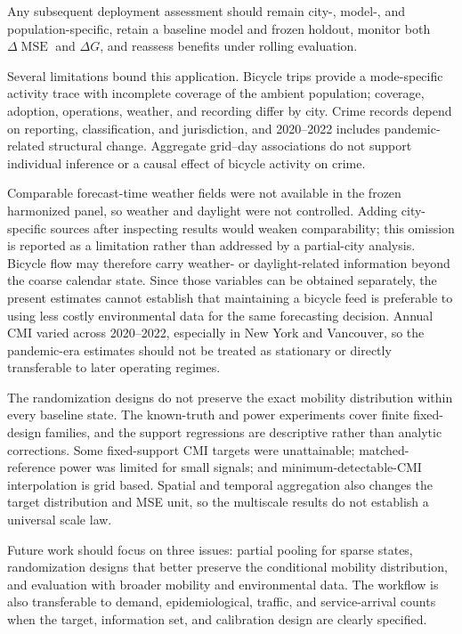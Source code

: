 \documentclass[applsci,article,accept,moreauthors]{Definitions/mdpi}
\begin{document}
Any subsequent deployment assessment should remain city-, model-, and
population-specific, retain a baseline model and frozen holdout, monitor both
\(\Delta\operatorname{MSE}\) and \(\Delta G\), and reassess benefits under
rolling evaluation.

Several limitations bound this application. Bicycle trips provide a
mode-specific activity trace with incomplete coverage of the ambient population;
coverage, adoption, operations, weather, and recording differ by city.
Crime records depend on reporting, classification, and jurisdiction, and
2020--2022 includes pandemic-related structural change. Aggregate
grid--day associations do not support individual inference or a causal
effect of bicycle activity on crime.

{Comparable forecast-time weather fields were not available in the
frozen harmonized panel, so weather and daylight were not controlled. Adding
city-specific sources after inspecting results would weaken comparability;
this omission is reported as a limitation rather than addressed by a
partial-city analysis. Bicycle flow may therefore carry weather- or
daylight-related information beyond the coarse calendar state. Since those
variables can be obtained separately, the present estimates cannot establish
that maintaining a bicycle feed is preferable to using less costly
environmental data for the same forecasting decision. Annual CMI varied
across 2020--2022, especially in New
York and Vancouver, so the pandemic-era estimates should not be treated as
stationary or directly transferable to later operating regimes.}

The randomization designs do not preserve the exact mobility distribution
within every baseline state. The known-truth and power experiments cover
finite fixed-design families, and the support regressions are descriptive
rather than analytic corrections. Some fixed-support CMI targets were
unattainable; matched-reference power was limited for small signals; and
minimum-detectable-CMI interpolation is grid based. Spatial and temporal
aggregation also changes the target distribution and MSE unit, so the
multiscale results do not establish a universal scale law.

Future work should focus on three issues: partial pooling for sparse states,
randomization designs that better preserve the conditional mobility
distribution, and evaluation with broader mobility and environmental data.
The workflow is also transferable to demand, epidemiological, traffic, and
service-arrival counts when the target, information set, and calibration
design are clearly specified.
\end{document}
